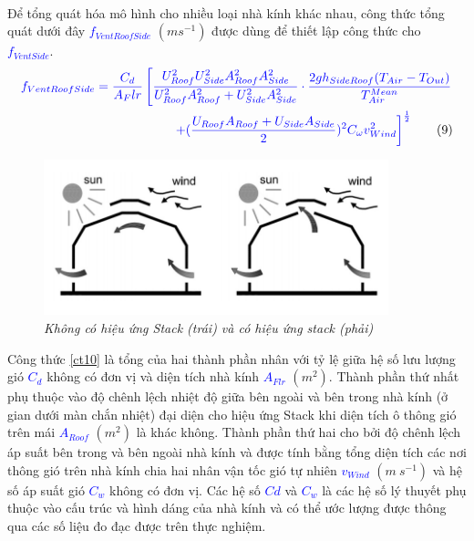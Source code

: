 \documentclass[13pt,a4paper]{article}
\begin{document}
			\\
			Để tổng quát hóa mô hình cho nhiều loại nhà kính khác nhau, công thức tổng quát dưới đây \textcolor{blue}{$f_{VentRoofSide}$} $(m s^{-1})$ được dùng để thiết lập công thức cho \textcolor{blue}{$f_{VentSide}$}.
			\begin{align}
				\textcolor{blue}{f_{VentRoofSide} = \frac{C_d}{A_Flr}\left[\frac{U^2_{Roof}U^2_{Side}A^2_{Roof}A^2_{Side}}{U^2_{Roof}A^2_{Roof} + U^2_{Side}A^2_{Side}}\cdot \frac{2gh_{SideRoof}(T_{Air} - T_{Out})}{T^{Mean}_{Air}}\right.} \nonumber \\
				\textcolor{blue}{\left. + (\frac{U_{Roof}A_{Roof} + U_{Side}A_{Side}}{2})^2C_{\omega}v^2_{Wind}\right]^{\frac{1}{2}}}
				\tag{9} \label{ct9}
			\end{align}
			\begin{figure}[h!]
				\begin{center}
					\includegraphics[width=10cm]{chimeny.png}
					\caption{\textit{Không có hiệu ứng Stack (trái) và có hiệu ứng stack (phải)}}
					\label{h9}
				\end{center}
			\end{figure}
			Công thức \eqref{ct10} là tổng của hai thành phần nhân với tỷ lệ giữa hệ số lưu lượng gió \textcolor{blue}{$C_d$} không có đơn vị và diện tích nhà kính \textcolor{blue}{$A_{Flr}$} $(m^2)$. Thành phần thứ nhất phụ thuộc vào độ chênh lệch nhiệt độ giữa bên ngoài và bên trong nhà kính (ở gian dưới màn chắn nhiệt) đại diện cho hiệu ứng Stack khi diện tích ô thông gió trên mái \textcolor{blue}{$A_{Roof}$} $(m^2)$ là khác không. Thành phần thứ hai cho bởi độ chênh lệch áp suất bên trong và bên ngoài nhà kính và được tính bằng tổng diện tích các nơi thông gió trên nhà kính chia hai nhân vận tốc gió tự nhiên \textcolor{blue}{$v_{Wind}$} $(m\ s^{-1})$ và hệ số áp suất
			gió \textcolor{blue}{$C_w$} không có đơn vị. Các hệ số \textcolor{blue}{$Cd$} và \textcolor{blue}{$C_w$} là các hệ số lý thuyết phụ thuộc vào cấu trúc và hình dáng của nhà kính và có thể ước lượng được thông qua các số liệu đo đạc được trên thực nghiệm. \\ \\ \\
\end{document}
